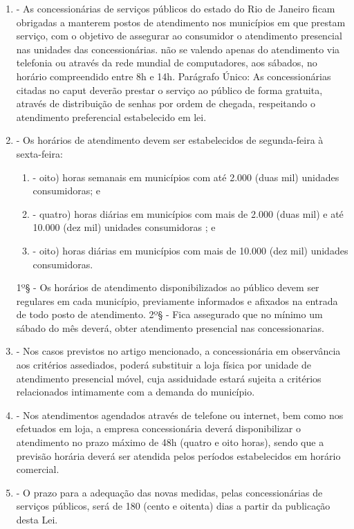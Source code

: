 \documentclass[10pt]{article}
\begin{document}
\begin{enumerate}[label=Art. \arabic*\textdegree]
\item - As concessionárias de serviços públicos do estado do Rio de Janeiro ficam obrigadas a manterem postos de atendimento nos municípios em que prestam serviço, com o objetivo de assegurar ao consumidor o atendimento presencial nas unidades das concessionárias. não se valendo apenas do atendimento via telefonia ou através da rede mundial de computadores, aos sábados, no horário compreendido entre 8h e 14h.
Parágrafo Único: As concessionárias citadas no caput deverão prestar o serviço ao público de forma gratuita, através de distribuição de senhas por ordem de chegada, respeitando o atendimento preferencial estabelecido em lei.

\item - Os horários de atendimento devem ser estabelecidos de segunda-feira à sexta-feira:
\begin{enumerate}[label=\Roman*]
\item - oito) horas semanais em municípios com até 2.000 (duas mil) unidades consumidoras; e
\item - quatro) horas diárias em municípios com mais de 2.000 (duas mil) e até 10.000 (dez mil) unidades consumidoras ; e
\item - oito) horas diárias em municípios com mais de 10.000 (dez mil) unidades consumidoras.
\end{enumerate}
1º§ - Os horários de atendimento disponibilizados ao público devem ser regulares em cada município, previamente informados e afixados na entrada de todo posto de atendimento.
2º§ - Fica assegurado que no mínimo um sábado do mês deverá, obter atendimento presencial nas concessionarias.

\item - Nos casos previstos no artigo mencionado, a concessionária em observância aos critérios assediados, poderá substituir a loja física por unidade de atendimento presencial móvel, cuja assiduidade estará sujeita a critérios relacionados intimamente com a demanda do município. 

\item - Nos atendimentos agendados através de telefone ou internet, bem como nos efetuados em loja, a empresa concessionária deverá disponibilizar o atendimento no prazo máximo de 48h (quatro e oito horas), sendo que a previsão horária deverá ser atendida pelos períodos estabelecidos em horário comercial.

\item - O prazo para a adequação das novas medidas, pelas concessionárias de serviços públicos, será de 180 (cento e oitenta) dias a partir da publicação desta Lei.


\end{enumerate}
\end{document}
